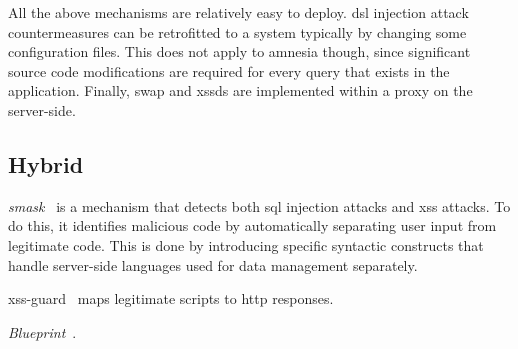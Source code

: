 \documentclass[conference]{IEEEtran}
\begin{document}
All the above mechanisms are relatively easy to deploy.
{\sc dsl} injection attack countermeasures
can be retrofitted to a system typically by changing
some configuration files. This does not apply
to {\sc amnesia} though, since significant source code
modifications are required for every query that exists
in the application. Finally, {\sc swap} and {\sc xssds}
are implemented within a proxy on the server-side.

\subsection{Hybrid}
\label{sec:hybrid}

{\it {\sc sm}ask}~\cite{JB07} is a mechanism that detects
both {\sc sql} injection attacks and {\sc xss} attacks.
To do this, it identifies malicious
code by automatically separating user input from legitimate code.
This is done by introducing specific syntactic constructs
that handle server-side languages used for data management
separately.

{\sc xss-guard}~\cite{BV08}
maps legitimate scripts to {\sc http} responses.

{\it Blueprint}~\cite{LV09}.
\end{document}

